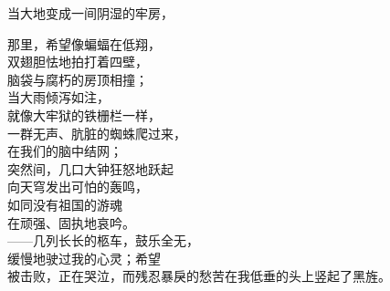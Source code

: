 \documentclass{article}
\begin{document}
当大地变成一间阴湿的牢房，\\
\newpage

那里，希望像蝙蝠在低翔，\\
双翅胆怯地拍打着四壁，
\\
脑袋与腐朽的房顶相撞； \\ 


当大雨倾泻如注，\\
就像大牢狱的铁栅栏一样，\\
一群无声、肮脏的蜘蛛爬过来，
\\
在我们的脑中结网； \\ 


突然间，几口大钟狂怒地跃起\\
向天穹发出可怕的轰鸣，\\
如同没有祖国的游魂
\\
在顽强、固执地哀吟。 \\ 


——几列长长的柩车，鼓乐全无，\\
缓慢地驶过我的心灵；希望\\
被击败，正在哭泣，而残忍暴戾的愁苦在我低垂的头上竖起了黑旌。
\end{document}
